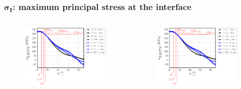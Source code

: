 \documentclass[first,firstsupp,lastsupp,last,hyperref,table]{ETHclass}
\begin{document}
\begin{frame}
\frametitle{\vspace{0.2cm}\small $\mathbf{\sigma_{I}}$: maximum principal stress at the interface}
\vspace{-.75cm}
\centering
\begin{columns}[c]
\centering
\begin{column}{0.5\textwidth}
\centering
\begin{figure}
\centering
\includegraphics[width=\columnwidth]{vf60-nodamage-sigmaI2D.pdf}
\end{figure}
\end{column}
\begin{column}{0.5\textwidth}
\centering
\begin{figure}
\centering
\includegraphics[width=\columnwidth]{vf60-nodamage-sigmaI3D.pdf}

\end{figure}
\end{column}
\end{columns}
\end{frame}
\end{document}
